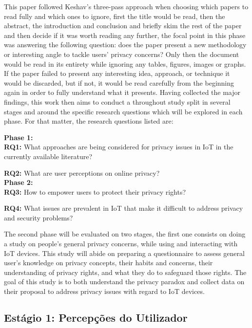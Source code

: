 \documentclass[conference]{IEEEtran}
\begin{document}
This paper followed Keshav's three-pass approach \cite{KeshavHow} when choosing
which papers to read fully and which ones to ignore, first the title would
be read, then the abstract, the introduction and conclusion and briefly
skim the rest of the paper and then decide if it was worth reading any further,
the focal point in this phase was answering the following question: does
the paper present a new methodology or interesting angle to tackle users'
privacy concerns? Only then the document would be read in its entirety while
ignoring any tables, figures, images or graphs. If the paper failed to present
any interesting idea, approach, or technique it would be discarded, but
if not, it would be read carefully from the beginning again in order to
fully understand what it presents. Having collected the major findings,
this work then aims to conduct a throughout study split in several stages
and around the specific research questions which will be explored in each
phase. For that matter, the research questions listed are:

\vspace{5mm}
\textbf{Phase 1:} \\

\textbf{RQ1:} What approaches are being considered for privacy issues in
IoT in the currently available literature?

\textbf{RQ2:} What are user perceptions on online privacy? \\

\textbf{Phase 2:} \\

\textbf{RQ3:}
How to empower users to protect their privacy rights?

\textbf{RQ4:} What issues are prevalent in IoT that make it difficult to
address privacy and security problems?
\vspace{5mm}

The second phase will be evaluated on two stages, the first one consists
on doing a study on people's general privacy concerns, while using and interacting
with IoT devices. This study will abide on preparing a questionnaire to
assess general user's knowledge on privacy concepts, their habits and concerns,
their understanding of privacy rights, and what they do to safeguard those
rights. The goal of this study is to both understand the privacy paradox
and collect data on their proposal to address privacy issues with regard
to IoT devices.

\subsection{Estágio 1: Percepções do Utilizador}
\end{document}
